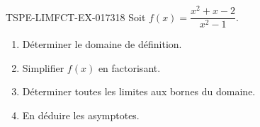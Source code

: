\begin{exercice}{TSPE-LIMFCT-EX-017}{3}{18}
Soit $f(x) = \dfrac{x^2 + x - 2}{x^2 - 1}$.
\begin{enumerate}
  \item Déterminer le domaine de définition.
  \item Simplifier $f(x)$ en factorisant.
  \item Déterminer toutes les limites aux bornes du domaine.
  \item En déduire les asymptotes.
\end{enumerate}
\end{exercice}
